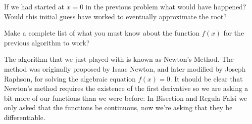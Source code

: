 \begin{problem}
\begin{center}
\end{center}
\end{problem}

\begin{problem}
    If we had started at $x=0$ in the previous problem what would have happened?  Would
    this initial guess have worked to eventually approximate the root?
\end{problem}

\begin{problem}
    Make a complete list of what you must know about the function $f(x)$ for the previous
    algorithm to work?
\end{problem}

The algorithm that we just played with is known as Newton's Method.  The method was
originally proposed by Isaac Newton, and later
modified by Joseph Raphson, for solving the algebraic equation $f(x)=0$. It should be
clear that Newton's method requires the existence of the first derivative so we are asking
a bit more of our functions than we were before: In Bisection and Regula Falsi we only
asked that the functions be continuous, now we're asking that they be differentiable.  

